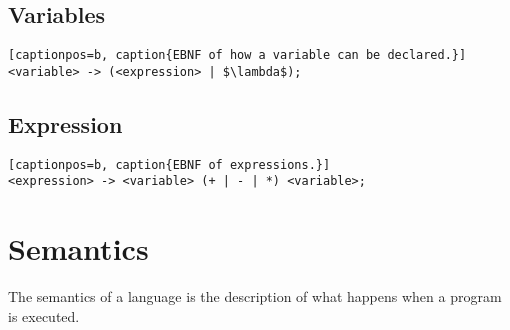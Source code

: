 \subsection{Variables}
\begin{lstlisting}[captionpos=b, caption{EBNF of how a variable can be declared.}]
<variable> -> (<expression> | $\lambda$);
\end{lstlisting}

\subsection{Expression}
\begin{lstlisting}[captionpos=b, caption{EBNF of expressions.}]
<expression> -> <variable> (+ | - | *) <variable>;
\end{lstlisting}
\section{Semantics}
The semantics of a language is the description of what happens when a program is executed. 

